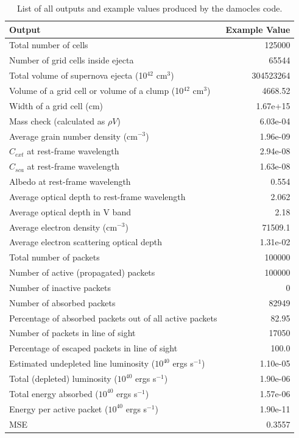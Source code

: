  \begin{table}
 \caption{List of all outputs and example values produced by the {\sc damocles} code.}
 \begin{center}
 \def\arraystretch{1.5}
 \begin{tabular}{ l  r}
 \toprule
 Output & Example Value \\
 \midrule
 Total number of cells      & 125000 \\
 Number of grid cells inside ejecta   & 65544 \\
 Total volume of supernova ejecta (10$^{42}$ cm$^3$)   & 304523264 \\
 Volume of a grid cell or volume of a clump (10$^{42}$ cm$^3$)   & 4668.52\\
 Width of a grid cell (cm) &   1.67e+15\\
 \midrule
 Mass check (calculated as $\rho V$)   & 6.03e-04 \\
 \midrule
 Average grain number density (cm$^{-3}$)  & 1.96e-09\\
 $C_{ext}$ at rest-frame wavelength  & 2.94e-08 \\
 $C_{sca}$ at rest-frame wavelength  & 1.63e-08 \\
 Albedo at rest-frame wavelength & 0.554 \\
 Average optical depth to rest-frame wavelength  & 2.062 \\
 Average optical depth in V band  & 2.18 \\
 \midrule
 Average electron density (cm$^{-3}$) & 71509.1 \\
 Average electron scattering optical depth &   1.31e-02\\
 \midrule
 Total number of packets      &          100000\\
 Number of active (propagated) packets      &          100000\\
 Number of inactive packets        &            0\\
 Number of absorbed packets      &          82949   \\
 Percentage of absorbed packets out of all active packets & 82.95 \\
 Number of packets in line of sight  & 17050       \\
 Percentage of escaped packets in line of sight & 100.0 \\
 \midrule
 Estimated undepleted line luminosity ($10^{40}$ ergs s$^{-1}$)  & 1.10e-05\\
 Total (depleted) luminosity ($10^{40}$ ergs s$^{-1}$) & 1.90e-06\\
 Total energy absorbed ($10^{40}$ ergs s$^{-1}$) &  1.57e-06\\
 Energy per active packet ($10^{40}$ ergs s$^{-1}$) & 1.90e-11\\
 \midrule
 MSE	& 0.3557  \\
 \bottomrule
 \end{tabular}
 \end{center}
 \label{tb:outputs}
\end{table}%

